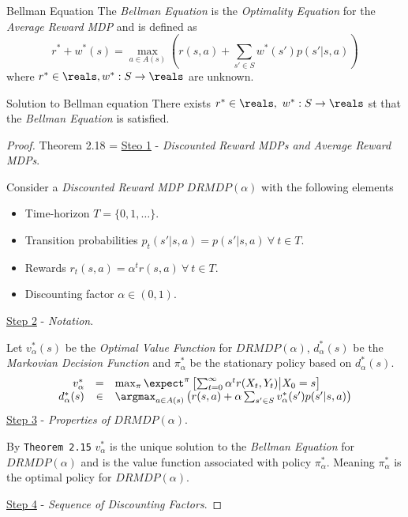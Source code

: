 \documentclass[11pt,a4paper]{article}
\begin{document}
  \begin{definition}{Bellman Equation}
    The \textit{Bellman Equation} is the \textit{Optimality Equation} for the \textit{Average Reward MDP} and is defined as
    \[ r^*+w^*(s)=\max_{a\in A(s)}\left(r(s,a)+\sum_{s'\in S}w^*(s')p(s'|s,a)\right) \]
    where $r^*\in\reals,w^*:S\to\reals$ are unknown.
  \end{definition}

  \begin{theorem}{Solution to Bellman equation}
    There exists $r^*\in\reals,\ w^*:S\to\reals$ st that the \textit{Bellman Equation} is satisfied.
  \end{theorem}

  \begin{proof}{Theorem 2.18}
    \everymath={\displaystyle}
    \underline{Steo 1} - \textit{Discounted Reward MDPs and Average Reward MDPs}.
    \par Consider a \textit{Discounted Reward MDP} $DRMDP(\alpha)$ with the following elements
    \begin{itemize}
      \item Time-horizon $T=\{0,1,\dots\}$.
      \item Transition probabilities $p_t(s'|s,a)=p(s'|s,a)\ \forall\ t\in T$.
      \item Rewards $r_t(s,a)=\alpha^tr(s,a)\ \forall\ t\in T$.
      \item Discounting factor $\alpha\in(0,1)$.
    \end{itemize}
    \underline{Step 2} - \textit{Notation}.
    \par Let $v_\alpha^*(s)$ be the \textit{Optimal Value Function} for $DRMDP(\alpha)$, $d_\alpha^*(s)$ be the \textit{Markovian Decision Function} and $\pi_\alpha^*$ be the stationary policy based on $d_\alpha^*(s)$.
    \[\begin{array}{rcl}
      v_\alpha^*&=&\max_\pi\expect^\pi\left[\sum_{t=0}^\infty\alpha^tr(X_t,Y_t)\big|X_0=s\right]\\
      d_\alpha^*(s)&\in&\argmax_{a\in A(s)}\left(r(s,a)+\alpha\sum_{s'\in S}v_\alpha^*(s')p(s'|s,a)\right)
    \end{array}\]
    \underline{Step 3} - \textit{Properties of $DRMDP(\alpha)$}.
    \par By \texttt{Theorem 2.15}  $v_\alpha^*$ is the unique solution to the \textit{Bellman Equation} for $DRMDP(\alpha)$ and is the value function associated with policy $\pi_\alpha^*$. Meaning $\pi_\alpha^*$ is the optimal policy for $DRMDP(\alpha)$.
    \par \underline{Step 4} - \textit{Sequence of Discounting Factors}.

\end{proof}
\end{document}

